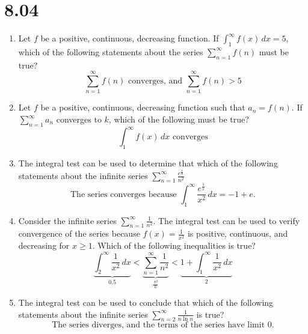 \documentclass[12pt]{article}
\begin{document}
\section*{8.04}
\begin{enumerate}
	\item Let $f$ be a positive, continuous, decreasing function. If $\int_{1}^{\infty}f(x)\,dx=5$, which of the following statements about the series $\sum_{n=1}^{\infty} f(n)$ must be true?
	$$\boxed{\sum_{n=1}^{\infty} f(n) \text{ converges, and } \sum_{n=1}^{\infty}f(n) > 5}$$
	\item Let $f$ be a positive, continuous, decreasing function such that $a_n=f(n)$. If $\sum_{n=1}^{\infty} a_n$ converges to $k$, which of the following must be true?
	$$\boxed{\int_{1}^{\infty} f(x) \, dx \text{ converges}}$$
	\item The integral test can be used to determine that which of the following statements about the infinite series $\sum_{n=1}^{\infty} \frac{e^{\frac{1}{n}}}{n^2}$
	$$\boxed{\text{The series converges because } \int_{1}^{\infty} \frac{e^{\frac{1}{x}}}{x^2} \, dx =-1+e.}$$
	\item Consider the infinite series $\sum_{n=1}^{\infty} \frac{1}{n^2}$. The integral test can be used to verify convergence of the series because $f(x)=\frac{1}{x^2}$ is positive, continuous, and decreasing for $x\geq 1$. Which of the following inequalities is true?
	$$\boxed{\underbrace{\int_{2}^{\infty} \frac{1}{x^2} \, dx}_{0.5}  < \underbrace{\sum_{n=1}^{\infty} \frac{1}{n^2}}_{\frac{\pi^2}{6}} < \underbrace{1 + \int_{1}^{\infty} \frac{1}{x^2} \, dx}_{2}}$$
	\item The integral test can be used to conclude that which of the following statements about the infinite series $\sum_{n=2}^{\infty} \frac{1}{n\ln n}$ is true?
	$$\boxed{\text{The series diverges, and the terms of the series have limit 0.}}$$
\end{enumerate}
\end{document}
